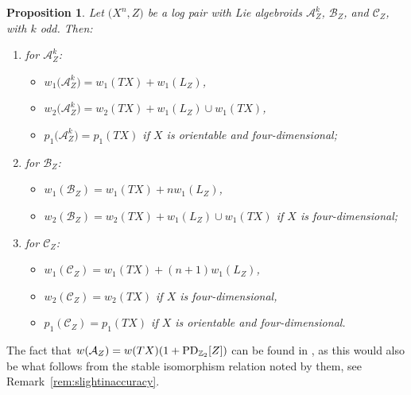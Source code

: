 \documentclass[pdftex]{sigma}
\numberwithin{equation}{section}
\newtheorem{Proposition}[Theorem]{Proposition}
 { \theoremstyle{definition}
\newtheorem{Definition}[Theorem]{Definition}
\newtheorem{Example}[Theorem]{Example}
\newtheorem{Remark}[Theorem]{Remark} }
\begin{document}
\begin{Proposition}\label{prop:logcharclass} Let $\big(X^n,Z\big)$ be a log pair with Lie algebroids $\mathcal{A}_Z^k$, $\mathcal{B}_Z$, and $\mathcal{C}_Z$, with $k$ odd. Then:
\begin{enumerate}\itemsep=0pt
\item[] for $\mathcal{A}^k_Z$:
\begin{itemize}\itemsep=0pt
\item $w_1\big(\mathcal{A}^k_Z\big) = w_1(TX) + w_1(L_Z)$,
\item $w_2\big(\mathcal{A}^k_Z\big) = w_2(TX) + w_1(L_Z) \cup w_1(TX)$,
\item $p_1\big(\mathcal{A}^k_Z\big) = p_1(TX)$ if $X$ is orientable and four-dimensional;
\end{itemize}
\item[]	for $\mathcal{B}_Z$:
\begin{itemize}\itemsep=0pt
\item $w_1(\mathcal{B}_Z) = w_1(TX) + n w_1(L_Z)$,
\item $w_2(\mathcal{B}_Z) = w_2(TX) + w_1(L_Z) \cup w_1(TX)$ if $X$ is four-dimensional;
\end{itemize}
\item[]	for $\mathcal{C}_Z$:
\begin{itemize}\itemsep=0pt
\item $w_1(\mathcal{C}_Z) = w_1(TX) + (n+1) w_1(L_Z)$,
\item $w_2(\mathcal{C}_Z) = w_2(TX)$ if $X$ is four-dimensional,
\item $p_1(\mathcal{C}_Z) = p_1(TX)$ if $X$ is orientable and four-dimensional.
\end{itemize}
\end{enumerate}
\end{Proposition}

\begin{Remark} The fact that $w(\mathcal{A}_Z) = w(TX)(1 + {\rm PD}_{\mathbb{Z}_2}[Z])$ can be found in \cite{CannasDaSilvaGuilleminWoodward00}, as this would also be what follows from the stable isomorphism relation noted by them, see Remark~\ref{rem:slightinaccuracy}.
\end{Remark}
\end{document}
